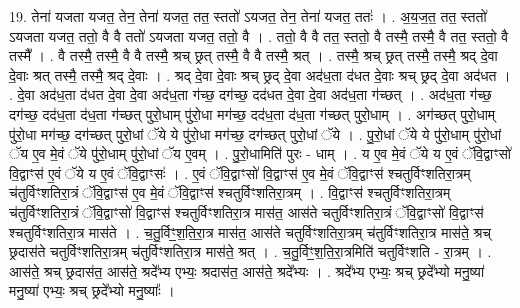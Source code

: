 \documentclass[17pt]{extarticle}
\begin{document}
19. तेना॑ यजता यजत॒ तेन॒ तेना॑ यजत॒ तत॒ स्ततो॑ ऽयजत॒ तेन॒ तेना॑ यजत॒ ततः॑ । . अ॒य॒ज॒त॒ तत॒ स्ततो॑ ऽयजता यजत॒ ततो॒ वै वै ततो॑ ऽयजता यजत॒ ततो॒ वै । . ततो॒ वै वै तत॒ स्ततो॒ वै तस्मै॒ तस्मै॒ वै तत॒ स्ततो॒ वै तस्मै᳚ । . वै तस्मै॒ तस्मै॒ वै वै तस्मै॒ श्रच् छ्रत् तस्मै॒ वै वै तस्मै॒ श्रत् । . तस्मै॒ श्रच् छ्रत् तस्मै॒ तस्मै॒ श्रद् दे॒वा दे॒वाः श्रत् तस्मै॒ तस्मै॒ श्रद् दे॒वाः । . श्रद् दे॒वा दे॒वाः श्रच् छ्रद् दे॒वा अद॑ध॒ता द॑धत दे॒वाः श्रच् छ्रद् दे॒वा अद॑धत । . दे॒वा अद॑ध॒ता द॑धत दे॒वा दे॒वा अद॑ध॒ता ग॑च्छ॒ दग॑च्छ॒ दद॑धत दे॒वा दे॒वा अद॑ध॒ता ग॑च्छत् । . अद॑ध॒ता ग॑च्छ॒ दग॑च्छ॒ दद॑ध॒ता द॑ध॒ता ग॑च्छत् पुरो॒धाम् पु॑रो॒धा मग॑च्छ॒ दद॑ध॒ता द॑ध॒ता ग॑च्छत् पुरो॒धाम् । . अग॑च्छत् पुरो॒धाम् पु॑रो॒धा मग॑च्छ॒ दग॑च्छत् पुरो॒धां ॅये ये पु॑रो॒धा मग॑च्छ॒ दग॑च्छत् पुरो॒धां ॅये । . पु॒रो॒धां ॅये ये पु॑रो॒धाम् पु॑रो॒धां ॅय ए॒व मे॒वं ॅये पु॑रो॒धाम् पु॑रो॒धां ॅय ए॒वम् । . पु॒रो॒धामिति॑ पुरः - धाम् । . य ए॒व मे॒वं ॅये य ए॒वं ॅवि॒द्वाꣳसो॑ वि॒द्वाꣳस॑ ए॒वं ॅये य ए॒वं ॅवि॒द्वाꣳसः॑ । . ए॒वं ॅवि॒द्वाꣳसो॑ वि॒द्वाꣳस॑ ए॒व मे॒वं ॅवि॒द्वाꣳस॑ श्चतुर्विꣳशतिरा॒त्रम् च॑तुर्विꣳशतिरा॒त्रं ॅवि॒द्वाꣳस॑ ए॒व मे॒वं ॅवि॒द्वाꣳस॑ श्चतुर्विꣳशतिरा॒त्रम् । . वि॒द्वाꣳस॑ श्चतुर्विꣳशतिरा॒त्रम् च॑तुर्विꣳशतिरा॒त्रं ॅवि॒द्वाꣳसो॑ वि॒द्वाꣳस॑ श्चतुर्विꣳशतिरा॒त्र मास॑त॒ आस॑ते चतुर्विꣳशतिरा॒त्रं ॅवि॒द्वाꣳसो॑ वि॒द्वाꣳस॑ श्चतुर्विꣳशतिरा॒त्र मास॑ते । . च॒तु॒र्विꣳ॒॒श॒ति॒रा॒त्र मास॑त॒ आस॑ते चतुर्विꣳशतिरा॒त्रम् च॑तुर्विꣳशतिरा॒त्र मास॑ते॒ श्रच् छ्रदास॑ते चतुर्विꣳशतिरा॒त्रम् च॑तुर्विꣳशतिरा॒त्र मास॑ते॒ श्रत् । . च॒तु॒र्विꣳ॒॒श॒ति॒रा॒त्रमिति॑ चतुर्विꣳशति - रा॒त्रम् । . आस॑ते॒ श्रच् छ्रदास॑त॒ आस॑ते॒ श्रदे᳚भ्य एभ्यः॒ श्रदास॑त॒ आस॑ते॒ श्रदे᳚भ्यः । . श्रदे᳚भ्य एभ्यः॒ श्रच् छ्रदे᳚भ्यो मनु॒ष्या॑ मनु॒ष्या॑ एभ्यः॒ श्रच् छ्रदे᳚भ्यो मनु॒ष्याः᳚ । \newline
\end{document}
